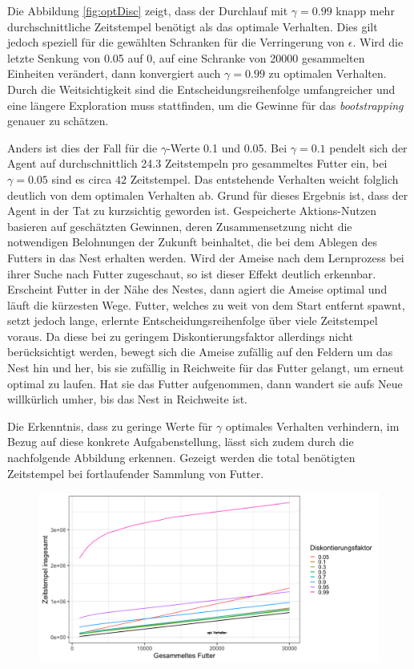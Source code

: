 \par 
Die Abbildung \ref{fig:optDisc} zeigt, dass der Durchlauf mit $\gamma = 0.99$ knapp mehr durchschnittliche Zeitstempel benötigt als das optimale Verhalten. Dies gilt jedoch speziell für die gewählten Schranken für die Verringerung von $\epsilon$. Wird die letzte Senkung von 0.05 auf 0, auf eine Schranke von 20000 gesammelten Einheiten verändert, dann konvergiert auch $\gamma = 0.99$ zu optimalen Verhalten. Durch die \glqq Weitsichtigkeit\grqq{} sind die Entscheidungsreihenfolge umfangreicher und eine längere Exploration muss stattfinden, um die Gewinne für das \textit{bootstrapping} genauer zu schätzen.
\par 
Anders ist dies der Fall für die $\gamma$-Werte 0.1 und 0.05. Bei $\gamma = 0.1$ pendelt sich der Agent auf durchschnittlich 24.3 Zeitstempeln pro gesammeltes Futter ein, bei $\gamma = 0.05$ sind es circa $42$ Zeitstempel. Das entstehende Verhalten weicht folglich deutlich von dem optimalen Verhalten ab. Grund für dieses Ergebnis ist, dass der Agent in der Tat zu \glqq kurzsichtig\grqq{} geworden ist. Gespeicherte Aktions-Nutzen basieren auf geschätzten Gewinnen, deren Zusammensetzung nicht die notwendigen Belohnungen der Zukunft beinhaltet, die bei dem Ablegen des Futters in das Nest erhalten werden. Wird der Ameise nach dem Lernprozess bei ihrer Suche nach Futter zugeschaut, so ist dieser Effekt deutlich erkennbar. Erscheint Futter in der Nähe des Nestes, dann agiert die Ameise optimal und läuft die kürzesten Wege. Futter, welches zu weit von dem Start entfernt spawnt, setzt jedoch lange, erlernte Entscheidungsreihenfolge über viele Zeitstempel voraus. Da diese bei zu geringem Diskontierungsfaktor allerdings nicht berücksichtigt werden, bewegt sich die Ameise zufällig auf den Feldern um das Nest hin und her, bis sie zufällig in Reichweite für das Futter gelangt, um erneut optimal zu laufen. Hat sie das Futter aufgenommen, dann wandert sie aufs Neue willkürlich umher, bis das Nest in Reichweite ist.
\par 
Die Erkenntnis, dass zu geringe Werte für $\gamma$ optimales Verhalten verhindern, im Bezug auf diese konkrete Aufgabenstellung, lässt sich zudem durch die nachfolgende Abbildung erkennen. Gezeigt werden die total benötigten Zeitstempel bei fortlaufender Sammlung von Futter.
\begin{figure}[H]
    \centering
    \includegraphics[width=\textwidth]{images/optDiscTotalTS}
    \label{fig:test1}
\end{figure}
